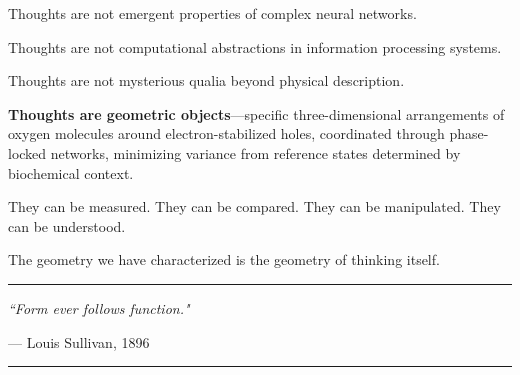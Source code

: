 \documentclass[12pt,a4paper]{article}
\begin{document}
Thoughts are not emergent properties of complex neural networks.

Thoughts are not computational abstractions in information processing systems.

Thoughts are not mysterious qualia beyond physical description.

\textbf{Thoughts are geometric objects}—specific three-dimensional arrangements of oxygen molecules around electron-stabilized holes, coordinated through phase-locked networks, minimizing variance from reference states determined by biochemical context.

They can be measured. They can be compared. They can be manipulated. They can be understood.

The geometry we have characterized is the geometry of thinking itself.

\vspace{1cm}

\begin{center}
\rule{0.5\textwidth}{0.4pt}

\textit{``Form ever follows function."}

— Louis Sullivan, 1896

\rule{0.5\textwidth}{0.4pt}
\end{center}
\end{document}
